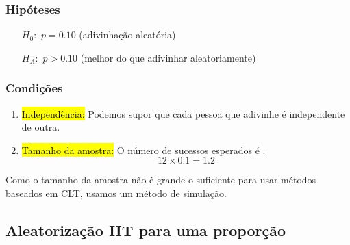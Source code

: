 \documentclass[11pt]{beamer}
\begin{document}

\begin{frame}
\frametitle{Hipóteses}


\begin{itemize}
\item[$H_0:$] $p = 0.10$ (adivinhação aleatória)
\item[$H_A:$] $p > 0.10$ (melhor do que adivinhar aleatoriamente)
\end{itemize}

\end{frame}


\begin{frame}
\frametitle{Condições}

\begin{enumerate}

\item \hl{Independência:} Podemos supor que cada pessoa que adivinhe é independente de outra.

\item \hl{Tamanho da amostra:} O número de sucessos esperados é .
\[ 12 \times 0.1 = 1.2 \]

\end{enumerate}


Como o tamanho da amostra não é grande o suficiente para usar métodos baseados em CLT, usamos um método de simulação.

\end{frame}


\subsection{Aleatorização HT para uma proporção}

\end{document}
